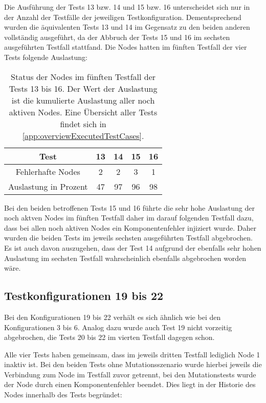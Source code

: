 Die Ausführung der Tests 13 bzw. 14 und 15 bzw. 16 unterscheidet sich nur in der Anzahl der Testfälle der jeweiligen Testkonfiguration.
Dementsprechend wurden die äquivalenten Tests 13 und 14 im Gegensatz zu den beiden anderen vollständig ausgeführt, da der Abbruch der Tests 15 und 16 im sechsten ausgeführten Testfall stattfand.
Die Nodes hatten im fünften Testfall der vier Tests folgende Auslastung:

\begin{table}[h]
    \begin{tabular}{c|cccc}
    	        Test          & 13 & 14 & 15 & 16 \\ \hline
    	  Fehlerhafte Nodes   & 2  & 2  & 3  & 1  \\
    	Auslastung in Prozent & 47 & 97 & 96 & 98
    \end{tabular}
    \caption[Status der Nodes im fünften Testfall der Tests 13 bis 16]
    {Status der Nodes im fünften Testfall der Tests 13 bis 16.
    Der Wert der Auslastung ist die kumulierte Auslastung aller noch aktiven Nodes.
    Eine Übersicht aller Tests findet sich in \cref{app:overviewExecutedTestCases}.}
    \label{tab:loadTests1316}
\end{table}

Bei den beiden betroffenen Tests 15 und 16 führte die sehr hohe Auslastung der noch aktven Nodes im fünften Testfall daher im darauf folgenden Testfall dazu, dass bei allen noch aktiven Nodes ein Komponentenfehler injiziert wurde.
Daher wurden die beiden Tests im jeweils sechsten ausgeführten Testfall abgebrochen.
Es ist auch davon auszugehen, dass der Test 14 aufgrund der ebenfalls sehr hohen Auslastung im sechsten Testfall wahrscheinlich ebenfalls abgebrochen worden wäre.

\subsection{Testkonfigurationen 19 bis 22}
\label{subsec:noReconf1922}

Bei den Konfigurationen 19 bis 22 verhält es sich ähnlich wie bei den Konfigurationen 3 bis 6.
Analog dazu wurde auch Test 19 nicht vorzeitig abgebrochen, die Tests 20 bis 22 im vierten Testfall dagegen schon.

Alle vier Tests haben gemeinsam, dass im jeweils dritten Testfall lediglich Node 1 inaktiv ist.
Bei den beiden Tests ohne Mutationsszenario wurde hierbei jeweils die Verbindung zum Node im Testfall zuvor getrennt, bei den Mutationstests wurde der Node durch einen Komponentenfehler beendet.
Dies liegt in der Historie des Nodes innerhalb des Tests begründet:

